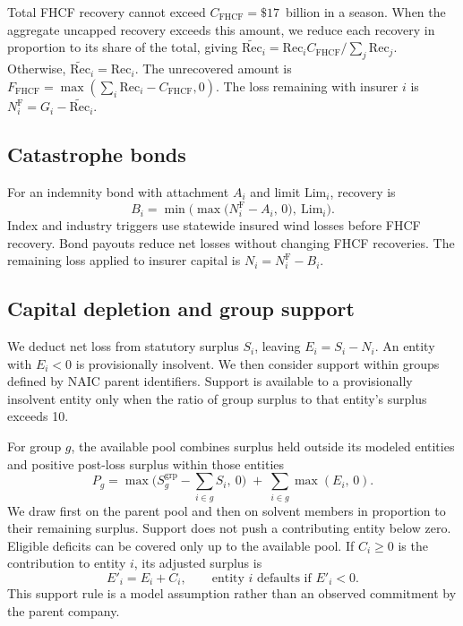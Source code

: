 Total FHCF recovery cannot exceed $C_{\mathrm{FHCF}}=\$17$~billion in a season. When the aggregate uncapped recovery exceeds this amount, we reduce each recovery in proportion to its share of the total, giving $\widetilde{\mathrm{Rec}}_i=\mathrm{Rec}_i C_{\mathrm{FHCF}}/\sum_j\mathrm{Rec}_j$. Otherwise, $\widetilde{\mathrm{Rec}}_i=\mathrm{Rec}_i$. The unrecovered amount is $F_{\mathrm{FHCF}}=\max(\sum_i\mathrm{Rec}_i-C_{\mathrm{FHCF}},0)$. The loss remaining with insurer $i$ is $N_i^{\mathrm{F}}=G_i-\widetilde{\mathrm{Rec}}_i$.

\subsection*{Catastrophe bonds}
For an indemnity bond with attachment $A_i$ and limit $\mathrm{Lim}_i$, recovery is
\begin{equation}
B_i = \min\!\Big(\max\big(N^{\mathrm{F}}_i - A_i,\,0\big),\ \mathrm{Lim}_i\Big).
\end{equation}
Index and industry triggers use statewide insured wind losses before FHCF recovery. Bond payouts reduce net losses without changing FHCF recoveries. The remaining loss applied to insurer capital is $N_i=N_i^{\mathrm{F}}-B_i$.

\subsection*{Capital depletion and group support}\label{MethodsRiskTransferCapital}
We deduct net loss from statutory surplus $S_i$, leaving $E_i=S_i-N_i$. An entity with $E_i<0$ is provisionally insolvent. We then consider support within groups defined by NAIC parent identifiers. Support is available to a provisionally insolvent entity only when the ratio of group surplus to that entity's surplus exceeds 10.

For group $g$, the available pool combines surplus held outside its modeled entities and positive post-loss surplus within those entities
\begin{equation}
P_g = \max\!\Big(S^{\mathrm{grp}}_g - \textstyle\sum_{i\in g} S_i,\ 0\Big)
      \;+\; \sum_{i\in g}\max(E_i,\,0).
\end{equation}
We draw first on the parent pool and then on solvent members in proportion to their remaining surplus. Support does not push a contributing entity below zero. Eligible deficits can be covered only up to the available pool. If $C_i\geq0$ is the contribution to entity $i$, its adjusted surplus is
\begin{equation}
E'_i = E_i + C_i,
\qquad
\text{entity $i$ defaults if } E'_i < 0.
\end{equation}
This support rule is a model assumption rather than an observed commitment by the parent company.

